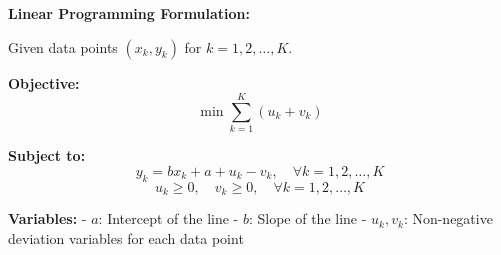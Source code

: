 \documentclass{article}
\begin{document}
\textbf{Linear Programming Formulation:}

Given data points \( (x_k, y_k) \) for \( k = 1, 2, \ldots, K \).

\textbf{Objective:}
\[
\min \sum_{k=1}^{K} (u_k + v_k)
\]

\textbf{Subject to:}
\[
y_k = bx_k + a + u_k - v_k, \quad \forall k = 1, 2, \ldots, K
\]
\[
u_k \geq 0, \quad v_k \geq 0, \quad \forall k = 1, 2, \ldots, K
\]

\textbf{Variables:}
- \( a \): Intercept of the line
- \( b \): Slope of the line
- \( u_k, v_k \): Non-negative deviation variables for each data point
\end{document}
